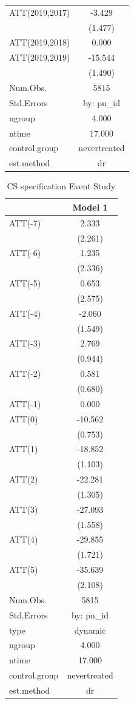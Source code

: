 \documentclass[
  12pt,
]{article}
\begin{document}
\begin{table}
\begin{tabular}[t]{lc}
ATT(2019,2017) & -3.429\\
 & (1.477)\\
ATT(2019,2018) & 0.000\\
ATT(2019,2019) & -15.544\\
 & (1.490)\\
\midrule
Num.Obs. & 5815\\
Std.Errors & by: pn\_id\\
ngroup & 4.000\\
ntime & 17.000\\
control.group & nevertreated\\
est.method & dr\\
\bottomrule
\end{tabular}
\end{table}

\begin{table}

\caption{\label{tab:table-4}CS specification Event Study}
\centering
\begin{tabular}[t]{lc}
\toprule
  & Model 1\\
\midrule
ATT(-7) & 2.333\\
 & (2.261)\\
ATT(-6) & 1.235\\
 & (2.336)\\
ATT(-5) & 0.653\\
 & (2.575)\\
ATT(-4) & -2.060\\
 & (1.549)\\
ATT(-3) & 2.769\\
 & (0.944)\\
ATT(-2) & 0.581\\
 & (0.680)\\
ATT(-1) & 0.000\\
ATT(0) & -10.562\\
 & (0.753)\\
ATT(1) & -18.852\\
 & (1.103)\\
ATT(2) & -22.281\\
 & (1.305)\\
ATT(3) & -27.093\\
 & (1.558)\\
ATT(4) & -29.855\\
 & (1.721)\\
ATT(5) & -35.639\\
 & (2.108)\\
\midrule
Num.Obs. & 5815\\
Std.Errors & by: pn\_id\\
type & dynamic\\
ngroup & 4.000\\
ntime & 17.000\\
control.group & nevertreated\\
est.method & dr\\
\bottomrule
\end{tabular}
\end{table}
\end{document}
